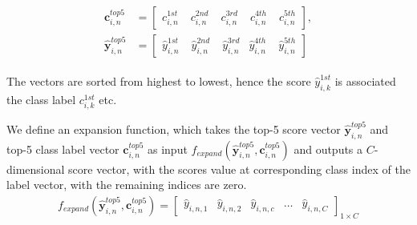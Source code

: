 \begin{align}
\begin{split}
\mathbf{c}_{i,n}^{top5} &= \begin{bmatrix}
c_{i,n}^{1st} & \phantom{.}c_{i,n}^{2nd} & \phantom{.}c_{i,n}^{3rd} & \phantom{.}c_{i,n}^{4th} & \phantom{.}c_{i,n}^{5th}
\end{bmatrix}, \\
\bm{\hat{y}}^{top5}_{i,n} &= \begin{bmatrix}
\hat{y}_{i,n}^{1st} & \phantom{.}\hat{y}_{i,n}^{2nd} & \phantom{.}\hat{y}_{i,n}^{3rd} & \hat{y}_{i,n}^{4th} & \phantom{.}\hat{y}_{i,n}^{5th}
\end{bmatrix}
\end{split}
\end{align}

The vectors are sorted from highest to lowest, hence the score $ \hat{y}_{i,k}^{1st} $ is associated the class label $ c_{i,k}^{1st} $ etc. 

We define an expansion function, which takes the top-5 score vector $ \bm{\hat{y}}_{i,n}^{top5}$ and top-5 class label vector  $\bm{c}_{i,n}^{top5}$ as input  $ f_{expand}\left(\bm{\hat{y}}_{i,n}^{top5},\bm{c}_{i,n}^{top5}\right) $ and outputs a $ C $-dimensional score vector, with the scores value at corresponding class index of the label vector, with the remaining indices are zero.
\begin{align}
f_{expand}\left(\bm{\hat{y}}_{i,n}^{top5},\bm{c}_{i,n}^{top5}\right) = 
\begin{bmatrix}
\hat{y}_{i,n,1} & \hat{y}_{i,n,2} & \hat{y}_{i,n,c} & \dots & \hat{y}_{i,n,C}
\end{bmatrix}_{1 \times C}
\end{align}


